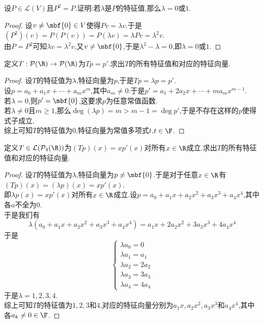 \documentclass{ctexart}
\begin{document}
\begin{problem}[8.]
    设$P\in\mathcal{L}(V)$且$P^2=P$.证明:若$\lambda$是$P$的特征值,那么$\lambda=0\text{或}1$.
\end{problem}
\begin{proof}
    设$v\neq\mbf{0}\in V$使得$Pv=\lambda v$.于是$(P^2)(v)=P(P(v))=P(\lambda v)=\lambda Pv=\lambda^2 v$.\\
    由$P=P^2$可知$\lambda v=\lambda^2 v$,又$v\neq\mbf{0}$,于是$\lambda^2-\lambda=0$,即$\lambda=0\text{或}1$.
\end{proof}
\begin{problem}[9.]
    定义$T:\mathcal{P}(\R)\to\mathcal{P}(\R)$为$Tp=p'$.求出$T$的所有特征值和对应的特征向量.
\end{problem}
\begin{proof}
    设$T$的特征值为$\lambda$,特征向量为$p$,于是$Tp=\lambda p=p'$.\\
    设$p=a_0+a_1x+\cdots+a_mx^m$,其中$a_m\neq 0$.于是$p'=a_1+2a_2x+\cdots+ma_mx^{m-1}$.\\
    若$\lambda=0$,则$p'=\mbf{0}$,这要求$p$为任意常值函数.\\
    若$\lambda\neq 0$且$m\geqslant 1$,那么$\deg(\lambda p)=m>m-1=\deg p'$,于是不存在这样的$p$使得式子成立.\\
    综上可知$T$的特征值为$0$,特征向量为常值多项式$t$,$t\in\F$.
\end{proof}
\begin{problem}[10.]
    定义$T\in\mathcal{L}(\mathcal{P}_4(\R))$为$(Tp)(x)=xp'(x)$对所有$x\in\R$成立.求出$T$的所有特征值和对应的特征向量.
\end{problem}
\begin{proof}
    设$T$的特征值为$\lambda$,特征向量为$p\neq\mbf{0}$.于是对于任意$x\in\R$有$(Tp)(x)=(\lambda p)(x)=xp'(x)$.\\
    即$\lambda p(x)=xp'(x)$对所有$x\in\R$成立.设$p=a_0+a_1x+a_2x^2+a_3x^3+a_4x^4$,其中各$a$不全为$0$.\\
    于是我们有$$\lambda\left(a_0+a_1x+a_2x^2+a_3x^3+a_4x^4\right)=a_1x+2a_2x^2+3a_3x^3+4a_4x^4$$
    于是$$\left\{\begin{array}{l}
        \lambda a_0=0\\
        \lambda a_1=a_1\\
        \lambda a_2=2a_2\\
        \lambda a_3=3a_3\\
        \lambda a_4=4a_4
    \end{array}\right.$$
    于是$\lambda=1,2,3,4$.\\
    综上可知$T$的特征值为$1,2,3$和$4$,对应的特征向量分别为$a_1x,a_2x^2,a_3x^3$和$a_4x^4$,其中各$a_k\neq0\in\F$.
\end{proof}
\end{document}
